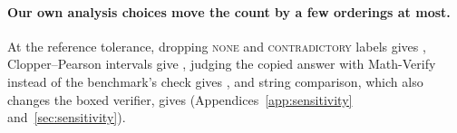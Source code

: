 \paragraph{Our own analysis choices move the count by a few orderings at most.}
At the reference tolerance, dropping \textsc{none} and \textsc{contradictory} labels gives
\SensDropFixed{}, Clopper--Pearson intervals give \SensCpFixed{}, judging the copied answer with
Math-Verify instead of the benchmark's check gives \SensMvFixed{}, and string comparison, which also
changes the boxed verifier, gives \SensStringFixed{} (Appendices~\ref{app:sensitivity}
and~\ref{sec:sensitivity}).
